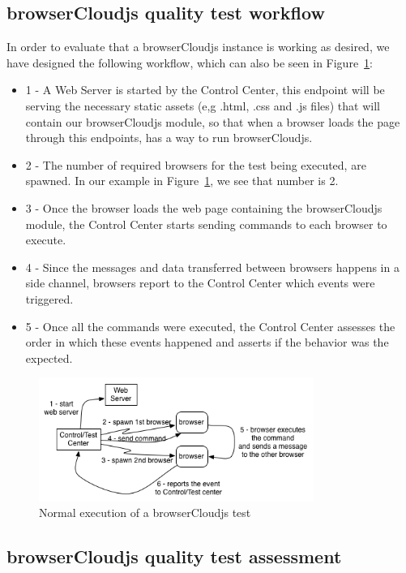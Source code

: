 \subsection{browserCloudjs quality test workflow}

In order to evaluate that a browserCloudjs instance is working as desired, we have designed the following workflow, which can also be seen in Figure~\ref{fig:t-f-1}:

\begin{itemize}
    \item 1 - A Web Server is started by the Control Center, this endpoint will be serving the necessary static assets (e,g .html, .css and .js files) that will contain our browserCloudjs module, so that when a browser loads the page through this endpoints, has a way to run browserCloudjs.
    \item 2 - The number of required browsers for the test being executed, are spawned. In our example in Figure~\ref{fig:t-f-1}, we see that number is 2.
    \item 3 - Once the browser loads the web page containing the browserCloudjs module, the Control Center starts sending commands to each browser to execute.
    \item 4 - Since the messages and data transferred between browsers happens in a side channel, browsers report to the Control Center which events were triggered.
    \item 5 - Once all the commands were executed, the Control Center assesses the order in which these events happened and asserts if the behavior was the expected.
\end{itemize}

\begin{figure}[h!]
  \centering
  \includegraphics[width=0.8\textwidth]{figs/testing-framework-1}
  \caption{Normal execution of a browserCloudjs test}
  \label{fig:t-f-1}
\end{figure}

\subsection{browserCloudjs quality test assessment}

